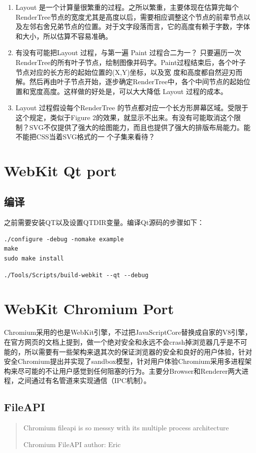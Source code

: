 \begin{enumerate}
	\item Layout 是一个计算量很繁重的过程。之所以繁重，主要体现在估算完每个RenderTree节点的宽度尤其是高度以后，需要相应调整这个节点的前辈节点以及左邻右舍兄弟节点的位置。对于文字段落而言，它的高度有赖于字数，字体和大小，所以估算不容易准确。
	\item 有没有可能把Layout 过程，与第一遍 Paint 过程合二为一？ 只要遍历一次RenderTree的所有叶子节点，绘制图像并码字。Paint过程结束后，各个叶子节点对应的长方形的起始位置的(X,Y)坐标，以及宽 度和高度都自然迎刃而解。然后再由叶子节点开始，逐步确定RenderTree中，各个中间节点的起始位置和宽度高度。这样做的好处是，可以大大降低 Layout 过程的成本。
	\item  Layout 过程假设每个RenderTree 的节点都对应一个长方形屏幕区域。受限于这个规定，类似于Figure 2的效果，就显示不出来。有没有可能取消这个限制？SVG不仅提供了强大的绘图能力，而且也提供了强大的排版布局能力。能不能把CSS当着SVG格式的一 个子集来看待？
\end{enumerate}

\section{WebKit Qt port}
\subsection{编译}
之前需要安装QT以及设置QTDIR变量。编译Qt源码的步骤如下：
\begin{verbatim}
./configure -debug -nomake example
make
sudo make install 
\end{verbatim}
\begin{verbatim}
./Tools/Scripts/build-webkit --qt --debug
\end{verbatim}
\section{WebKit Chromium Port}
Chromium采用的也是WebKit引擎，不过把JavaScriptCore替换成自家的V8引擎，在官方网页的文档上提到，做一个绝对安全和永远不会crash掉浏览器几乎是不可能的，所以需要有一些架构来退其次的保证浏览器的安全和良好的用户体验，针对安全Chromium提出并实现了sandbox模型，针对用户体验Chromium采用多进程架构来尽可能的不让用户感觉到任何阻塞的行为。主要分Browser和Renderer两大进程，之间通过有名管道来实现通信（IPC机制）。
\subsection{FileAPI}
\begin{quotation}
	Chromium fileapi is so messsy with its multiple process architecture

	\begin{flushright}
		Chromium FileAPI author: Eric
	\end{flushright}
\end{quotation}


